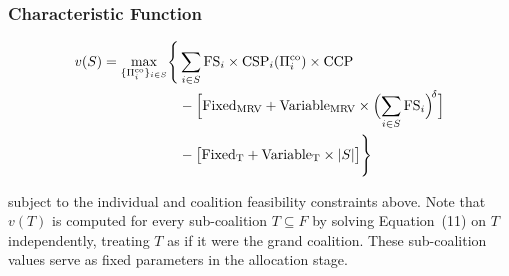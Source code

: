 \documentclass[manuscript, screen, review, anonymous]{acmart}
\begin{document}
\subsubsection*{Characteristic Function}

\begin{equation}
\begin{split}
v(S) = \max_{\{\Pi_i^{\text{co}}\}_{i \in S}} \Biggl\{
    & \sum_{i \in S}
        \text{FS}_i \times \text{CSP}_i(\Pi_i^{\text{co}}) \times \text{CCP} \\
    & - \Bigl[\text{Fixed}_{\text{MRV}} + \text{Variable}_{\text{MRV}}
        \times \Bigl(\sum_{i \in S} \text{FS}_i\Bigr)^{\!\delta}\Bigr] \\
    & - \bigl[\text{Fixed}_{\text{T}} + \text{Variable}_{\text{T}} \times |S|\bigr]
    \Biggr\}
\end{split}
\end{equation}

subject to the individual and coalition feasibility constraints above.
Note that $v(T)$ is computed for every sub-coalition $T \subseteq F$ by
solving Equation~(11) on $T$ independently, treating $T$ as if it were the
grand coalition. These sub-coalition values serve as fixed parameters in the
allocation stage.






\end{document}

